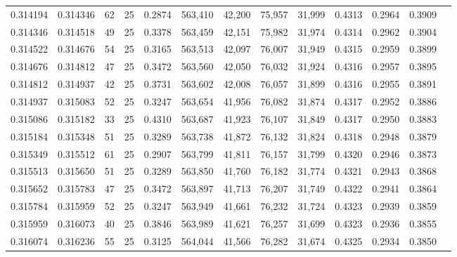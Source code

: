 \begin{tabular}{rrrrrrrrrrrrr}
0.314194 & 0.314346 &    62 &  25 &                                     0.2874 & 563,410 &  42,200 &  75,957 &  31,999 & 0.4313 & 0.2964 & 0.3909 \\
0.314346 & 0.314518 &    49 &  25 &                                     0.3378 & 563,459 &  42,151 &  75,982 &  31,974 & 0.4314 & 0.2962 & 0.3904 \\
0.314522 & 0.314676 &    54 &  25 &                                     0.3165 & 563,513 &  42,097 &  76,007 &  31,949 & 0.4315 & 0.2959 & 0.3899 \\
0.314676 & 0.314812 &    47 &  25 &                                     0.3472 & 563,560 &  42,050 &  76,032 &  31,924 & 0.4316 & 0.2957 & 0.3895 \\
0.314812 & 0.314937 &    42 &  25 &                                     0.3731 & 563,602 &  42,008 &  76,057 &  31,899 & 0.4316 & 0.2955 & 0.3891 \\
0.314937 & 0.315083 &    52 &  25 &                                     0.3247 & 563,654 &  41,956 &  76,082 &  31,874 & 0.4317 & 0.2952 & 0.3886 \\
0.315086 & 0.315182 &    33 &  25 &                                     0.4310 & 563,687 &  41,923 &  76,107 &  31,849 & 0.4317 & 0.2950 & 0.3883 \\
0.315184 & 0.315348 &    51 &  25 &                                     0.3289 & 563,738 &  41,872 &  76,132 &  31,824 & 0.4318 & 0.2948 & 0.3879 \\
0.315349 & 0.315512 &    61 &  25 &                                     0.2907 & 563,799 &  41,811 &  76,157 &  31,799 & 0.4320 & 0.2946 & 0.3873 \\
0.315513 & 0.315650 &    51 &  25 &                                     0.3289 & 563,850 &  41,760 &  76,182 &  31,774 & 0.4321 & 0.2943 & 0.3868 \\
0.315652 & 0.315783 &    47 &  25 &                                     0.3472 & 563,897 &  41,713 &  76,207 &  31,749 & 0.4322 & 0.2941 & 0.3864 \\
0.315784 & 0.315959 &    52 &  25 &                                     0.3247 & 563,949 &  41,661 &  76,232 &  31,724 & 0.4323 & 0.2939 & 0.3859 \\
0.315959 & 0.316073 &    40 &  25 &                                     0.3846 & 563,989 &  41,621 &  76,257 &  31,699 & 0.4323 & 0.2936 & 0.3855 \\
0.316074 & 0.316236 &    55 &  25 &                                     0.3125 & 564,044 &  41,566 &  76,282 &  31,674 & 0.4325 & 0.2934 & 0.3850 \\

\end{tabular}
